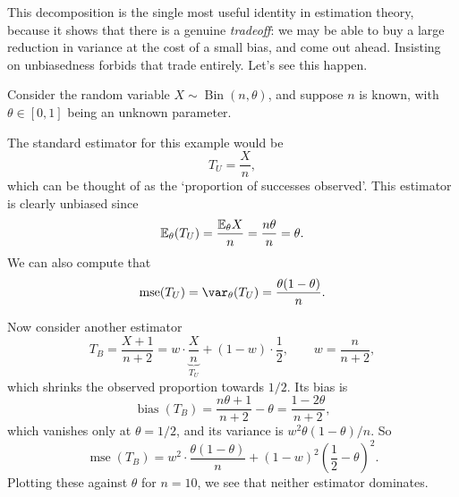 \documentclass[a4paper]{scrartcl}
\newcommand{\bias}{\operatorname{bias}}
\newcommand{\mse}{\operatorname{mse}}
\newcommand{\Bin}{\operatorname{Bin}}
\begin{document}
This decomposition is the single most useful identity in estimation theory, because it shows that there is a genuine \emph{tradeoff}: we may be able to buy a large reduction in variance at the cost of a small bias, and come out ahead. Insisting on unbiasedness forbids that trade entirely. Let's see this happen.

\begin{example}
  Consider the random variable $X \sim \Bin(n, \theta)$, and suppose $n$ is known, with $\theta \in [0, 1]$ being an unknown parameter.

  The standard estimator for this example would be
  $$
  T_U = \frac{X}{n},
  $$
  which can be thought of as the `proportion of successes observed'.
  This estimator is clearly unbiased since
  $$
  \mathbb{E}_\theta(T_U) = \frac{\mathbb{E}_\theta{X}}{n} = \frac{n \theta}{n} = \theta.
  $$
  We can also compute that
  $$
  \mse(T_U) = \var_\theta(T_U) = \frac{\theta(1 - \theta)}{n}.
  $$

  Now consider another estimator
  $$
  T_B = \frac{X + 1}{n + 2} = w \cdot \underbrace{\frac{X}{n}}_{T_U} + (1 - w)\cdot\frac{1}{2}, \qquad w = \frac{n}{n+2},
  $$
  which shrinks the observed proportion towards $1/2$. Its bias is
  $$
  \bias(T_B) = \frac{n\theta + 1}{n+2} - \theta = \frac{1 - 2\theta}{n + 2},
  $$
  which vanishes only at $\theta = 1/2$, and its variance is $w^2\theta(1-\theta)/n$. So
  $$
  \mse(T_B) = w^2 \cdot \frac{\theta(1-\theta)}{n} + (1 - w)^2\left(\frac{1}{2} - \theta\right)^2.
  $$
  Plotting these against $\theta$ for $n = 10$, we see that neither estimator dominates.


\end{example}
\end{document}
